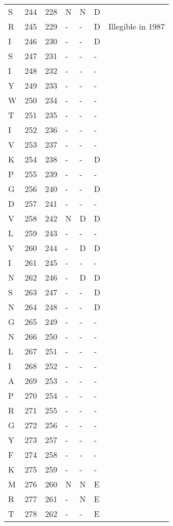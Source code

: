 \begin{longtable}{lllllll}
  S & 244 & 228 & N & N & D &  \\ 
  R & 245 & 229 & - & - & D & Illegible in 1987 \\ 
  I & 246 & 230 & - & - & D &  \\ 
  S & 247 & 231 & - & - & - &  \\ 
  I & 248 & 232 & - & - & - &  \\ 
  Y & 249 & 233 & - & - & - &  \\ 
  W & 250 & 234 & - & - & - &  \\ 
  T & 251 & 235 & - & - & - &  \\ 
  I & 252 & 236 & - & - & - &  \\ 
  V & 253 & 237 & - & - & - &  \\ 
  K & 254 & 238 & - & - & D &  \\ 
  P & 255 & 239 & - & - & - &  \\ 
  G & 256 & 240 & - & - & D &  \\ 
  D & 257 & 241 & - & - & - &  \\ 
  V & 258 & 242 & N & D & D &  \\ 
  L & 259 & 243 & - & - & - &  \\ 
  V & 260 & 244 & - & D & D &  \\ 
  I & 261 & 245 & - & - & - &  \\ 
  N & 262 & 246 & - & D & D &  \\ 
  S & 263 & 247 & - & - & D &  \\ 
  N & 264 & 248 & - & - & D &  \\ 
  G & 265 & 249 & - & - & - &  \\ 
  N & 266 & 250 & - & - & - &  \\ 
  L & 267 & 251 & - & - & - &  \\ 
  I & 268 & 252 & - & - & - &  \\ 
  A & 269 & 253 & - & - & - &  \\ 
  P & 270 & 254 & - & - & - &  \\ 
  R & 271 & 255 & - & - & - &  \\ 
  G & 272 & 256 & - & - & - &  \\ 
  Y & 273 & 257 & - & - & - &  \\ 
  F & 274 & 258 & - & - & - &  \\ 
  K & 275 & 259 & - & - & - &  \\ 
  M & 276 & 260 & N & N & E &  \\ 
  R & 277 & 261 & - & N & E &  \\ 
  T & 278 & 262 & - & - & E &  \\ 

\end{longtable}
